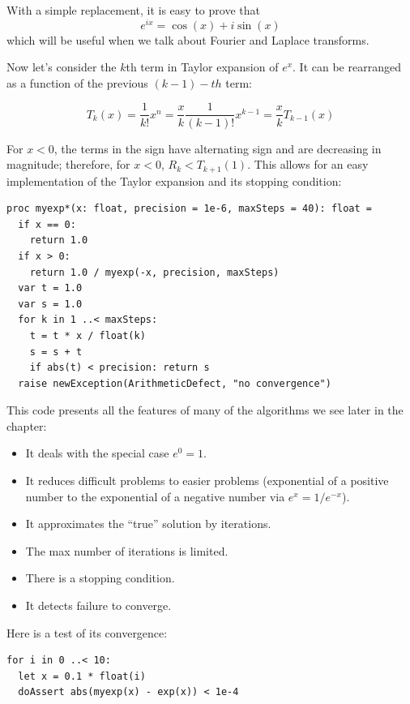 \documentclass[justified, sixbynine]{tufte-book}
\def\ft{\small\tt}
\theoremstyle{plain}%
\newtheorem * {corollary}{Corollary}
\theoremstyle{definition}
\theoremstyle{remark}
\newtheorem * {remark}{Remark}
\newtheorem * {note}{Note}
\begin{document}
\begin{fullwidth}
With a simple replacement, it is easy to prove that
\begin{equation}
e^{ix} = \cos(x) + i \sin(x)
\end{equation}
which will be useful when we talk about Fourier and Laplace transforms.

Now let's consider the $k$th term in Taylor expansion of $e^x$. It can be rearranged as a function of the previous $(k-1)-th$ term:

\begin{equation}
T_k(x) = \frac1{k!}x^n = \frac{x}{k} \frac1{(k-1)!}x^{k-1} = \frac{x}{k} T_{k-1}(x)
\end{equation}

For $x<0$, the terms in the sign have alternating sign and are decreasing in magnitude; therefore, for $x<0$, $R_k<T_{k+1}(1)$. This allows for an easy implementation of the Taylor expansion and its stopping condition:

\begin{lstlisting}[caption={in file: {\ft nlib/taylor.nim}}]
proc myexp*(x: float, precision = 1e-6, maxSteps = 40): float =
  if x == 0:
    return 1.0
  if x > 0:
    return 1.0 / myexp(-x, precision, maxSteps)
  var t = 1.0
  var s = 1.0
  for k in 1 ..< maxSteps:
    t = t * x / float(k)
    s = s + t
    if abs(t) < precision: return s
  raise newException(ArithmeticDefect, "no convergence")
\end{lstlisting}

This code presents all the features of many of the algorithms we see later in the chapter:
\begin{itemize}
\item It deals with the special case $e^0=1$.
\item It reduces difficult problems to easier problems (exponential of a positive number to the exponential of a negative number via $e^x = 1/e^{-x}$).
\item It approximates the ``true'' solution by iterations.
\item The max number of iterations is limited.
\item There is a stopping condition.
\item It detects failure to converge.
\end{itemize}

Here is a test of its convergence:

\begin{lstlisting}
for i in 0 ..< 10:
  let x = 0.1 * float(i)
  doAssert abs(myexp(x) - exp(x)) < 1e-4
\end{lstlisting}


\end{fullwidth}
\end{document}

